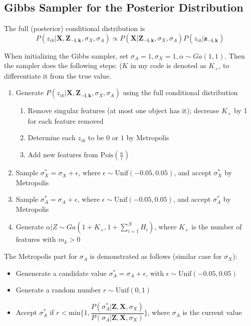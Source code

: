 \subsection{Gibbs Sampler for the Posterior Distribution}

The full (posterior) conditional distribution is
\begin{equation}
P(z_{ik} | \mathbf{X,Z_{-i,k}},\sigma_X, \sigma_A) \propto P(\mathbf{X} | \mathbf{Z_{-i,k}},\sigma_X, \sigma_A) P(z_{ik} | \mathbf{z_{-i,k}})
\end{equation}

When initializing the Gibbs sampler, set $\sigma_A = 1, \sigma_X = 1, \alpha \sim Ga(1,1)$. Then the sampler does the following steps: ($K$ in my code is denoted as $K_+$, to differentiate it from the true value.

\begin{enumerate}
\item Generate $P(z_{ik} | \mathbf{X,Z_{-i,k}},\sigma_X, \sigma_A)$ using the full conditional distribution
    \begin{enumerate}
    \item Remove singular features (at most one object has it); decrease $K_+$ by 1 for each feature removed
    \item Determine each $z_{ik}$ to be $0$ or $1$ by Metropolis
    \item Add new features from $\text{Pois}(\frac{\alpha}{i})$
    \end{enumerate}
\item Sample $\sigma_{X}^* = \sigma_X + \epsilon$, where $\epsilon \sim \text{Unif}(-0.05,0.05)$, and accept $\sigma_{X}^*$ by Metropolis 
\item Sample $\sigma_{A}^* = \sigma_A + \epsilon$, where $\epsilon \sim \text{Unif}(-0.05,0.05)$, and accept $\sigma_{A}^*$ by Metropolis 
\item Generate $\alpha|Z \sim Ga(1+K_+,1+\sum^{N}_{i=1}H_i)$, where $K_+$ is the number of features with $m_k > 0$
\end{enumerate}

The Metropolis part for $\sigma_A$ is demonstrated as follows (similar case for $\sigma_X$):
\begin{itemize}
\item Genenerate a candidate value $\sigma_{A}^{*} = \sigma_{A} + \epsilon$, with $\epsilon \sim \text{Unif}(-0.05,0.05)$
\item Generate a random number $r \sim \text{Unif}(0,1)$
\item Accept $\sigma_{A}^{*}$ if $r < \text{min}\{ 1, \dfrac{P(\sigma_{A}^{*} | \mathbf{Z,X},\sigma_X)}{P(\sigma_{A} | \mathbf{Z,X},\sigma_X)} \}$, where $\sigma_{A}$ is the current value
\end{itemize}

